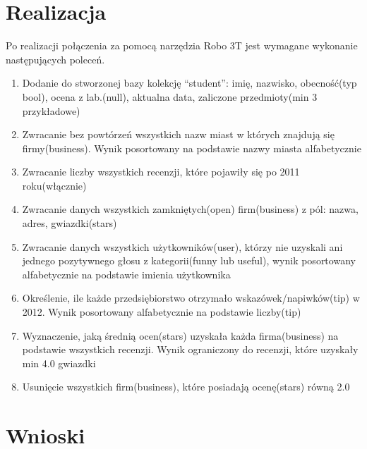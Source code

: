 \documentclass{article}
\begin{document}
\section{Realizacja}

Po realizacji połączenia za pomocą narzędzia Robo 3T jest wymagane wykonanie następujących poleceń.
\begin{enumerate}
\item Dodanie do stworzonej bazy kolekcję ``student'': imię, nazwisko, obecność(typ bool), ocena z lab.(null), aktualna data, zaliczone przedmioty(min 3 przykładowe)

\item Zwracanie bez powtórzeń wszystkich nazw miast w których znajdują się firmy(business). Wynik posortowany na podstawie nazwy miasta alfabetycznie

\item Zwracanie liczby wszystkich recenzji, które pojawiły się po 2011 roku(włącznie)

\item Zwracanie danych wszystkich zamkniętych(open) firm(business) z pól: nazwa, adres, gwiazdki(stars)

\item Zwracanie danych wszystkich użytkowników(user), którzy nie uzyskali ani jednego pozytywnego głosu z kategorii(funny lub useful), wynik posortowany alfabetycznie na podstawie imienia użytkownika

\item Określenie, ile każde przedsiębiorstwo otrzymało wskazówek/napiwków(tip) w 2012. Wynik posortowany alfabetycznie na podstawie liczby(tip)

\item Wyznaczenie, jaką średnią ocen(stars) uzyskała każda firma(business) na podstawie wszystkich recenzji. Wynik ograniczony do recenzji, które uzyskały min 4.0 gwiazdki

\item Usunięcie wszystkich firm(business), które posiadają ocenę(stars) równą 2.0
\end{enumerate}

\section{Wnioski}
\end{document}
